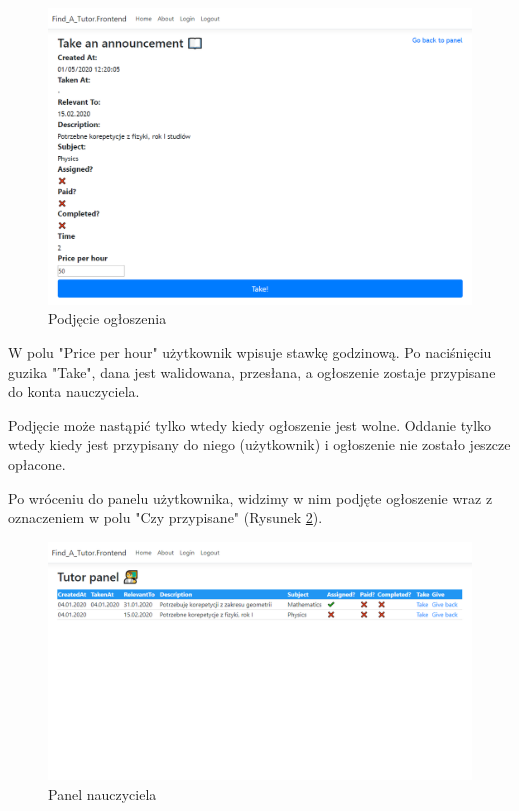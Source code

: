 \documentclass[12pt]{article}
\newcommand{\cmark}{\textcolor{green!80!black}{\ding{51}}}
\numberwithin{figure}{section}
\begin{document}
\begin{sloppypar}
\begin{figure}[H] 
    \centering
    \includegraphics[width=1\textwidth]{images/chapter_4/take.png}
    \caption{Podjęcie ogłoszenia}
    \label{fig:take}
\end{figure}

W polu "Price per hour" użytkownik wpisuje stawkę godzinową. Po naciśnięciu guzika "Take", dana jest walidowana, przesłana, a ogłoszenie zostaje przypisane do konta nauczyciela.

Podjęcie może nastąpić tylko wtedy kiedy ogłoszenie jest wolne. Oddanie tylko wtedy kiedy jest przypisany do niego (użytkownik) i ogłoszenie nie zostało jeszcze opłacone.

Po wróceniu do panelu użytkownika, widzimy w nim podjęte ogłoszenie wraz z oznaczeniem \cmark w polu "Czy przypisane" (Rysunek \ref{fig:tutor-assigned}).
\begin{figure}[H] 
    \centering
    \includegraphics[width=1\textwidth]{images/chapter_4/tutor-assigned.png}
    \caption{Panel nauczyciela}
    \label{fig:tutor-assigned}
\end{figure}


\end{sloppypar}
\end{document}
